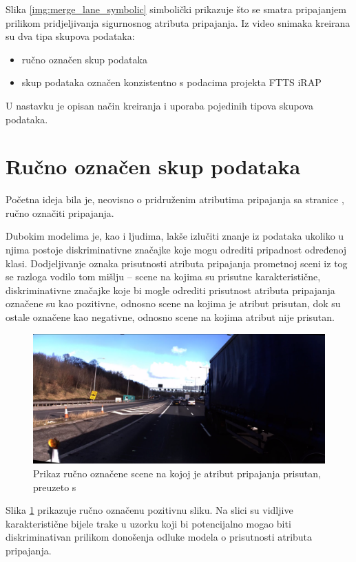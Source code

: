\documentclass[times, utf8, diplomski, numeric]{fer}
\begin{document}
\noindent Slika \ref{img:merge_lane_symbolic} simbolički prikazuje što se smatra pripajanjem prilikom pridjeljivanja sigurnosnog atributa pripajanja.
Iz video snimaka kreirana su dva tipa skupova podataka:
\begin{itemize}
 \item ručno označen skup podataka
 \item skup podataka označen konzistentno s podacima projekta FTTS iRAP
\end{itemize}
U nastavku je opisan način kreiranja i uporaba pojedinih tipova skupova podataka.

\section{Ručno označen skup podataka}
Početna ideja bila je, neovisno o pridruženim atributima pripajanja sa stranice \citep{url:ftts_irap}, ručno označiti pripajanja. 

Dubokim modelima je, kao i ljudima, lakše izlučiti znanje iz podataka ukoliko u njima postoje diskriminativne značajke koje mogu odrediti pripadnost određenoj klasi.
Dodjeljivanje oznaka prisutnosti atributa pripajanja prometnoj sceni iz tog se razloga vodilo tom mišlju -- scene na kojima su prisutne karakteristične, diskriminativne značajke koje bi mogle odrediti prisutnost atributa pripajanja označene su kao pozitivne, odnosno scene na kojima je atribut prisutan, dok su ostale označene kao negativne, odnosno scene na kojima atribut nije prisutan.

\begin{figure}[H]
\centering
\includegraphics[scale=0.15]{images/hand_labeled_positive.png}
\caption{Prikaz ručno označene scene na kojoj je atribut pripajanja prisutan, preuzeto s \citep{url:ftts_irap}}
\label{img:hand_labeled_positive}
\end{figure}

\noindent Slika \ref{img:hand_labeled_positive} prikazuje ručno označenu pozitivnu sliku. 
Na slici su vidljive karakteristične bijele trake u uzorku koji bi potencijalno mogao biti diskriminativan prilikom donošenja odluke modela o prisutnosti atributa pripajanja.
\end{document}
